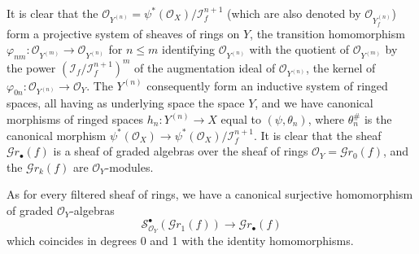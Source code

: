 It is clear that the
$\mathcal{O}_{Y^{(n)}}=\psi^*(\mathcal{O}_X)/\mathscr{I}_f^{n+1}$
(which are also denoted by $\mathcal{O}_{Y_f^{(n)}}$) form a
projective system of sheaves of rings on $Y$, the transition homomorphism
$\varphi_{nm}:\mathcal{O}_{Y^{(m)}}\to\mathcal{O}_{Y^{(n)}}$ for $n\leq m$
identifying $\mathcal{O}_{Y^{(n)}}$ with the quotient of $\mathcal{O}_{Y^{(m)}}$ by the
power $(\mathscr{I}_f/\mathscr{I}_f^{n+1})^m$ of the augmentation ideal of
$\mathcal{O}_{Y^{(n)}}$, the kernel of
$\varphi_{0n}:\mathcal{O}_{Y^{(n)}}\to\mathcal{O}_Y$. The $Y^{(n)}$ consequently
form an inductive system of ringed spaces, all having as underlying space
the space $Y$, and we have canonical morphisms of ringed spaces
$h_n:Y^{(n)}\to X$ equal to $(\psi,\theta_n)$, where $\theta_n^\#$ is the
canonical morphism
$\psi^*(\mathcal{O}_X)\to\psi^*(\mathcal{O}_X)/\mathscr{I}_f^{n+1}$.
It is clear that the sheaf $\mathscr{G}r_\bullet(f)$ is a sheaf of graded
algebras over the sheaf of rings
$\mathcal{O}_Y=\mathscr{G}r_0(f)$, and the $\mathscr{G}r_k(f)$ are
$\mathcal{O}_Y$-modules.

As for every filtered sheaf of rings, we have a canonical surjective
homomorphism of graded $\mathcal{O}_Y$-algebras
\[
  \mathscr{S}_{\mathcal{O}_Y}^{\bullet}(\mathscr{G}r_1(f))
  \longrightarrow\mathscr{G}r_\bullet(f)
  \tag{16.1.2.2}
  \label{IV.16.1.2.2}
\]
which coincides in degrees 0 and 1 with the identity homomorphisms.


